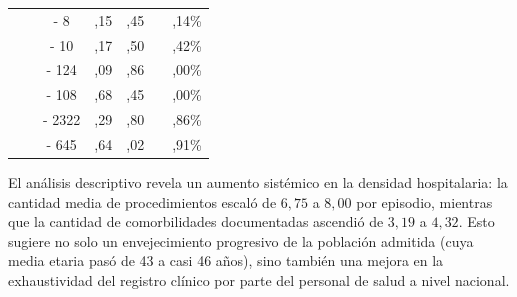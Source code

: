 \begin{table}[htbp]
\begin{tabular}{|l|c|c|c|c|c|c|}
\parbox[t]{3.0cm}{} & \parbox[t]{1.5cm}{} & \parbox[t]{1.5cm}{ - 8} & \parbox[t]{1.5cm}{,15} & \parbox[t]{1.5cm}{,45} & \parbox[t]{1.5cm}{} & \parbox[t]{1.5cm}{,14\%} \\ 
\parbox[t]{3.0cm}{} & \parbox[t]{1.5cm}{} & \parbox[t]{1.5cm}{ - 10} & \parbox[t]{1.5cm}{,17} & \parbox[t]{1.5cm}{,50} & \parbox[t]{1.5cm}{} & \parbox[t]{1.5cm}{,42\%} \\ \hline

\parbox[t]{3.0cm}{} & \parbox[t]{1.5cm}{} & \parbox[t]{1.5cm}{ - 124} & \parbox[t]{1.5cm}{,09} & \parbox[t]{1.5cm}{,86} & \parbox[t]{1.5cm}{} & \parbox[t]{1.5cm}{,00\%} \\ 
\parbox[t]{3.0cm}{} & \parbox[t]{1.5cm}{} & \parbox[t]{1.5cm}{ - 108} & \parbox[t]{1.5cm}{,68} & \parbox[t]{1.5cm}{,45} & \parbox[t]{1.5cm}{} & \parbox[t]{1.5cm}{,00\%} \\ \hline

\parbox[t]{3.0cm}{} & \parbox[t]{1.5cm}{} & \parbox[t]{1.5cm}{ - 2322} & \parbox[t]{1.5cm}{,29} & \parbox[t]{1.5cm}{,80} & \parbox[t]{1.5cm}{} & \parbox[t]{1.5cm}{,86\%} \\ 
\parbox[t]{3.0cm}{} & \parbox[t]{1.5cm}{} & \parbox[t]{1.5cm}{ - 645} & \parbox[t]{1.5cm}{,64} & \parbox[t]{1.5cm}{,02} & \parbox[t]{1.5cm}{} & \parbox[t]{1.5cm}{,91\%} \\ \hline
\end{tabular}
\end{table}

El análisis descriptivo revela un aumento sistémico en la densidad hospitalaria: la cantidad media de procedimientos escaló de $6,75$ a $8,00$ por episodio, mientras que la cantidad de comorbilidades documentadas ascendió de $3,19$ a $4,32$. Esto sugiere no solo un envejecimiento progresivo de la población admitida (cuya media etaria pasó de 43 a casi 46 años), sino también una mejora en la exhaustividad del registro clínico por parte del personal de salud a nivel nacional.

